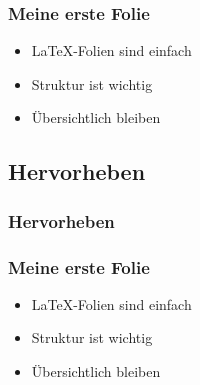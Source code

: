 \documentclass{beamer}
\begin{document}
\begin{frame}
\frametitle{Meine erste Folie}
  \begin{itemize}
    \item<1-> \LaTeX-Folien sind einfach
    \item<3-> Struktur ist wichtig
    \item<2-> Übersichtlich bleiben
  \end{itemize}
\end{frame}

\subsection{Hervorheben}
\begin{frame}[fragile]
\frametitle{Hervorheben}
  \begin{semiverbatim}
  \end{semiverbatim}
\end{frame}

\begin{frame}
\frametitle{Meine erste Folie}
  \begin{itemize}
    \item \LaTeX-Folien sind \alert<1-2>{einfach}
    \item \alert<-3>{Struktur} ist wichtig
    \item \alert<4>{Übersichtlich} bleiben
  \end{itemize}
\end{frame}
\end{document}
